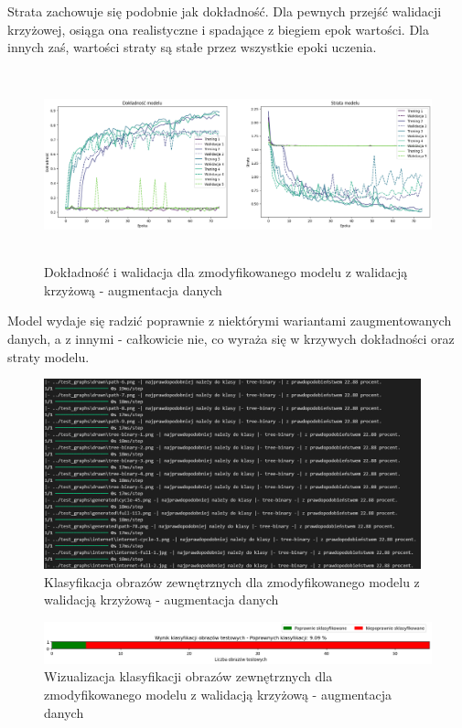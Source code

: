 Strata zachowuje się podobnie jak dokładność. Dla pewnych przejść walidacji krzyżowej, osiąga ona realistyczne
i spadające z biegiem epok wartości. Dla innych zaś, wartości straty są stałe przez wszystkie epoki uczenia.

\begin{figure}[ht]
	\centering
	\includegraphics[height=5.5cm]{resources/tests/images/v4/crossvalid_3_img.png}
	\caption{Dokładność i walidacja dla zmodyfikowanego modelu z walidacją krzyżową - augmentacja danych}
	\label{Fig:tests-cv-3a}
\end{figure}
\FloatBarrier

Model wydaje się radzić poprawnie z niektórymi wariantami zaugmentowanych danych, a z innymi - całkowicie nie,
co wyraża się w krzywych dokładności oraz straty modelu.

\begin{figure}[ht]
	\centering
	\includegraphics[height=5.5cm]{resources/tests/images/v4/crossvalid_3_txt.png}
	\caption{Klasyfikacja obrazów zewnętrznych dla zmodyfikowanego modelu z walidacją krzyżową - augmentacja danych}
	\label{Fig:tests-cv-3b}
\end{figure}
\FloatBarrier

\begin{figure}[ht]
	\centering
	\includegraphics[width=14cm]{resources/tests/images/v4/crossvalid_3_bar.png}
	\caption{Wizualizacja klasyfikacji obrazów zewnętrznych dla zmodyfikowanego modelu z walidacją krzyżową - augmentacja danych}
	\label{Fig:tests-cv-3c}
\end{figure}
\FloatBarrier


